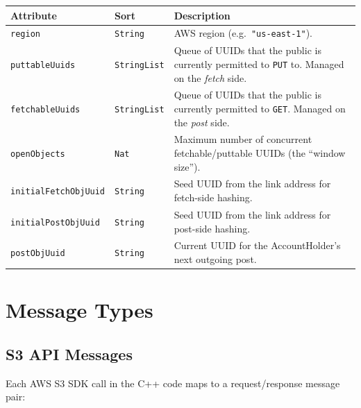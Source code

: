 \documentclass[11pt]{article}
\begin{document}
\begin{table}[H]
\centering
\begin{tabular}{@{}llp{6.5cm}@{}}
\toprule
\textbf{Attribute} & \textbf{Sort} & \textbf{Description} \\
\midrule
\texttt{region}              & \texttt{String}     & AWS region (e.g.\ \texttt{"us-east-1"}). \\
\texttt{puttableUuids}       & \texttt{StringList} & Queue of UUIDs that the public is currently permitted to \texttt{PUT} to. Managed on the \emph{fetch} side. \\
\texttt{fetchableUuids}      & \texttt{StringList} & Queue of UUIDs that the public is currently permitted to \texttt{GET}. Managed on the \emph{post} side. \\
\texttt{openObjects}         & \texttt{Nat}        & Maximum number of concurrent fetchable/puttable UUIDs (the ``window size''). \\
\texttt{initialFetchObjUuid} & \texttt{String}     & Seed UUID from the link address for fetch-side hashing. \\
\texttt{initialPostObjUuid}  & \texttt{String}     & Seed UUID from the link address for post-side hashing. \\
\texttt{postObjUuid}         & \texttt{String}     & Current UUID for the AccountHolder's next outgoing post. \\
\bottomrule
\end{tabular}
\end{table}

\section{Message Types}\label{sec:messages}

\subsection{S3 API Messages}

Each AWS S3 SDK call in the C++ code maps to a request/response message
pair:
\end{document}

